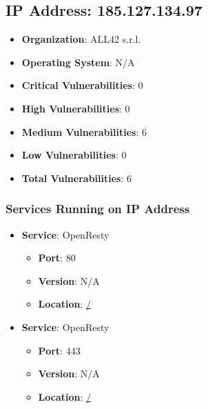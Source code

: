\documentclass{article}
\begin{document}
\begin{itemize}
\end{itemize}




\clearpage



\subsection*{IP Address: 185.127.134.97}

\begin{itemize}
    \item \textbf{Organization}: ALL42 s.r.l.
    \item \textbf{Operating System}:  N/A 
    \item \textbf{Critical Vulnerabilities}: 0
    \item \textbf{High Vulnerabilities}: 0
    \item \textbf{Medium Vulnerabilities}: 6
    \item \textbf{Low Vulnerabilities}: 0
    \item \textbf{Total Vulnerabilities}: 6
\end{itemize}

\subsubsection*{Services Running on IP Address}

\begin{itemize}
    
        \item \textbf{Service}: OpenResty
        \begin{itemize}
            \item \textbf{Port}: 80
            \item \textbf{Version}:  N/A 
            \item \textbf{Location}: \href{ / }{ / }
        \end{itemize}
    
        \item \textbf{Service}: OpenResty
        \begin{itemize}
            \item \textbf{Port}: 443
            \item \textbf{Version}:  N/A 
            \item \textbf{Location}: \href{ / }{ / }
        \end{itemize}
    
\end{itemize}
\end{document}
